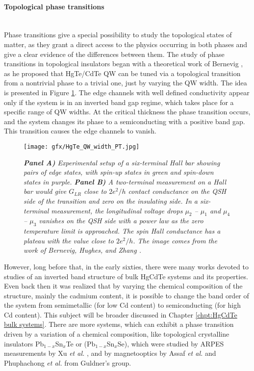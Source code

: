 \documentclass[titlepage,a4paper]{book}
\newcommand{\wciecie}{\quad\phantom{v}}
\newcommand{\myparagraph}[1]{\paragraph{#1}\mbox{}\\}
\begin{document}
\myparagraph{Topological phase transitions}
\wciecie
Phase transitions give a special possibility to study the topological states of matter, as they grant a direct access to the physics occurring in both phases and give a clear evidence of the differences between them. The study of phase transitions in topological insulators began with a theoretical work of Bernevig \cite{Bernevig_Topology2}, as he proposed that HgTe/CdTe QW can be tuned via a topological transition from a nontrivial phase to a trivial one, just by varying the QW width. The idea is presented in Figure \ref{fig:HgTe_QW_width_PT}. The edge channels with well defined conductivity appear only if the system is in an inverted band gap regime, which takes place for a specific range of QW widths. At the critical thickness the phase transition occurs, and the system changes its phase to a semiconducting with a positive band gap. This transition causes the edge channels to vanish.

\begin{figure}[ht]
	\centering
	\texttt{[image: gfx/HgTe\_QW\_width\_PT.jpg]}
	\vspace{-10pt}
	\caption{\textit{\textbf{Panel A)} Experimental setup of a six-terminal Hall bar showing pairs of edge states, with spin-up states in green and spin-down states in purple. \textbf{Panel B)} A two-terminal measurement on a Hall bar would give $G_{LR}$ close to $2e^2/h$ contact conductance on the QSH side of the transition and zero on the insulating side. In a six-terminal measurement, the longitudinal voltage drops $\mu_2$ -- $\mu_1$ and $\mu_4$ -- $\mu_3$ vanishes on the QSH side with a power law as the zero temperature limit is approached. The spin Hall conductance has a plateau with the value close to $2e^2/h$. The image comes from the work of Bernevig, Hughes, and Zhang \cite{Bernevig_Topology2}.}}
	\label{fig:HgTe_QW_width_PT}
\end{figure} 

However, long before that, in the early sixties, there were many works devoted to studies of an inverted band structure of bulk HgCdTe systems and its properties. Even back then it was realized that by varying the chemical composition of the structure, mainly the cadmium content, it is possible to change the band order of the system from semimetallic (for low Cd content) to semiconducting (for high Cd content). This subject will be broader discussed in Chapter \ref{chpt:HgCdTe bulk systems}. There are more systems, which can exhibit a phase transition driven by a variation of a chemical composition, like topological crystalline insulators Pb$_{1-x}$Sn$_{x}$Te or (Pb$_{1-x}$Sn$_{x}$Se), which were studied by ARPES measurements by Xu \textit{et al.} \cite{Xu_CTI}, and by magnetooptics by Assaf \textit{et al.} \cite{Assaf_MCT_layers1} and Phuphachong \textit{et al.} \cite{Assaf_MCT_layers2} from Guldner's group.  
\end{document}
